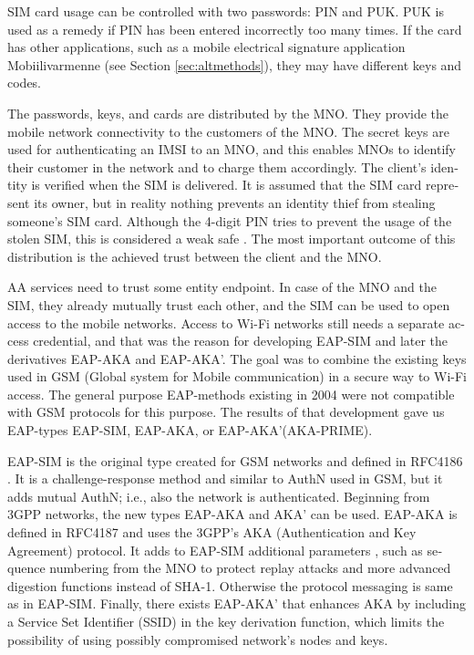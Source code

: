 \documentclass[12pt,a4paper,english]{tutthesis}
\begin{document}
\begin{otherlanguage}{english}
SIM card usage can be controlled with two passwords: PIN and PUK.  PUK
is used as a remedy if PIN has been entered incorrectly too many times.
If the card has other applications, such as a mobile electrical
signature application Mobiilivarmenne (see Section \ref{sec:altmethods}),
they may have different keys and codes.


The passwords, keys, and cards are distributed by the MNO.
They 
provide the mobile network connectivity to the customers of the MNO.  The
secret keys are used for authenticating an IMSI to an MNO, and this
enables MNOs to identify their customer in the network and to charge them
accordingly.  The client's identity is verified when the SIM is delivered.
It is assumed that the SIM card represent its owner, but in reality
nothing prevents an identity thief from stealing  someone's SIM
card. Although the 4-digit PIN tries to prevent the usage of the
stolen SIM, this is considered a weak safe \cite[p.31]{aaa-nakhjiri2005}.
The most important outcome of this distribution is the achieved trust
between the client and the MNO.


AA services need to trust some entity endpoint. In case of the MNO
and the
SIM, they already mutually trust each other, and the SIM can be used 
to open access to the mobile networks.
Access to Wi-Fi networks still needs a separate access credential,
and that was the reason for developing EAP-SIM and later the
derivatives EAP-AKA and EAP-AKA'.  The goal was to combine 
the existing keys used in  GSM (Global system for Mobile communication)
in a secure way to Wi-Fi access. The general purpose EAP-methods existing in 2004 were not
compatible with GSM protocols for this purpose. \cite[p.93]{hav-doc}
The results of that development gave us EAP-types EAP-SIM, EAP-AKA, or
EAP-AKA'(AKA-PRIME).

EAP-SIM is the original type created for GSM networks and defined 
in RFC4186 \cite{rfc4186}.
It is a challenge-response method and similar to AuthN used in GSM, 
but it adds mutual AuthN; i.e., also the network is authenticated.
Beginning from 3GPP networks, the new types EAP-AKA and AKA' can be used.
EAP-AKA is defined in RFC4187 \cite{rfc4187} and 
uses the 3GPP's AKA (Authentication and Key Agreement) protocol.
It adds to EAP-SIM additional parameters \cite{rfc5448}, such as
sequence numbering from the MNO to protect replay attacks and more
advanced digestion functions instead of SHA-1.
Otherwise the protocol messaging is same as in  EAP-SIM.
Finally, there exists EAP-AKA' that enhances AKA by including a Service Set
Identifier (SSID) 
in the key derivation function, which limits the possibility of using possibly
compromised network's nodes and keys. 



\end{otherlanguage}
\end{document}
